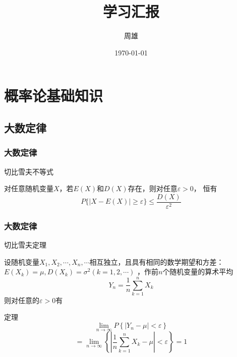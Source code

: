 \documentclass[aspectratio=169]{beamer}
\author{周雄}
\title{学习汇报}
\date{\today}
\begin{document}
\frame[plain]{\titlepage}

\begin{frame}

\tableofcontents
\end{frame}

\section{概率论基础知识}

\frame{\tableofcontents[currentsection]}

\subsection*{大数定律}

\begin{frame}
\frametitle{大数定律}
{切比雪夫不等式}
\vspace{0.3cm}
\begin{theorem}
  对任意随机变量$X$，若$E(X)$和$D(X)$存在，则对任意$\varepsilon >0$，
  恒有
\begin{equation}
    P\{ |X-E(X)|\geqslant \varepsilon \} \leqslant \frac{D(X)}{\varepsilon ^2}
\end{equation}  
\end{theorem}
\end{frame}

\begin{frame}
\frametitle{大数定律}
{切比雪夫定理}
\vspace{0.3cm}
\begin{theorem}
    设随机变量$X_{1}, X_{2}, \cdots, X_{n}, \cdots$相互独立，且具有相同的数学期望和方差：
    $E\left(X_{k}\right)=\mu, D\left(X_{k}\right)=\sigma^{2}(k=1,2, \cdots)$
    ，作前$n$个随机变量的算术平均\\
    $$Y_{n}=\frac{1}{n} \sum_{k=1}^{n} X_{k}$$
    则对任意的$\varepsilon >0$有
\end{theorem}
\end{frame}

\begin{frame}[plain]
    \begin{block}{定理}
       $$\lim _{n \rightarrow \infty} P\left\{\left|Y_{n}-\mu\right|<\varepsilon\right\}$$
    \begin{equation} \label{eq:qbxf}
        = \lim_{n \to \infty} \left \{ \left | \frac{1}{n} \sum_{k=1}^{n}X_{k} -\mu    \right |< \varepsilon   \right \}= 1 
    \end{equation}
    \end{block}
\end{frame}
\end{document}
